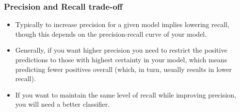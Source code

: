\begin{frame}[fragile]\frametitle{Precision and Recall trade-off}
\begin{itemize}
\item Typically to increase precision for a given model implies lowering recall, though this depends on the precision-recall curve of your model.
\item Generally, if you want higher precision you need to restrict the positive predictions to those with highest certainty in your model, which means predicting fewer positives overall (which, in turn, usually results in lower recall).
\item If you want to maintain the same level of recall while improving precision, you will need a better classifier.
\end{itemize}
\end{frame}









